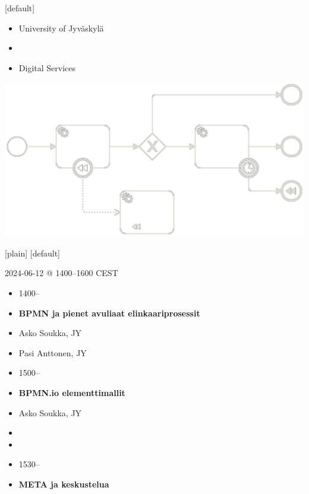 \documentclass[12pt,aspectratio=169]{beamer}
\begin{document}
[default]
\begin{frame}[standout]
\begin{minipage}{0.4\textwidth}
\begin{itemize}[]
  \item[] University of Jyväskylä
  \item[]
  \item[] Digital Services
\end{itemize}
\end{minipage}
\begin{minipage}{0.5\textwidth}
\includegraphics[width=0.8\paperwidth]{images/bpmn-example.png}
\end{minipage}
\end{frame}

[plain]
[default]


\begin{frame}{2024-06-12 @ 1400–1600 CEST}
\begin{minipage}{0.5\textwidth}
\begin{itemize}[]
    \item[] 1400–
    \item[] \textbf{BPMN ja pienet avuliaat elinkaariprosessit}
    \item[] Asko Soukka, JY
    \item[] Pasi Anttonen, JY
\end{itemize}
\end{minipage}
\begin{minipage}{0.45\textwidth}
\begin{itemize}[]
    \item[] 1500–
    \item[] \textbf{BPMN.io elementtimallit}
    \item[] Asko Soukka, JY
    \item[]
    \item[]
\end{itemize}
\end{minipage}
    \vspace{0.5cm}
\begin{itemize}[]
    \item[] 1530–
    \item[] \textbf{META ja keskustelua}
\end{itemize}
\end{frame}
\end{document}
